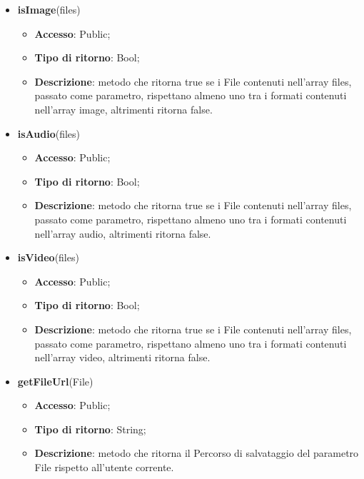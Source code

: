 {{{\begin{itemize}
\begin{itemize}
					\item \textbf{Accesso}: Public;
					\item \textbf{Tipo di ritorno}: Void;
					\item \textbf{Descrizione}: metodo che invia una richiesta XMLHttpRequest a \textit{[hostname]\-/private/api/files//} effettuando l'upload dei File contenuti nell'array files passato come parametro. Se l'operazione ha successo viene richiamato callback, altrimenti viene lanciato un errore.
				\end{itemize}
				\item \textbf{isImage}(files)
				\begin{itemize}
					\item \textbf{Accesso}: Public;
					\item \textbf{Tipo di ritorno}: Bool;
					\item \textbf{Descrizione}: metodo che ritorna true se i File contenuti nell'array files, passato come parametro, rispettano almeno uno tra i formati contenuti nell'array image, altrimenti ritorna false.
				\end{itemize}
				\item \textbf{isAudio}(files)
				\begin{itemize}
					\item \textbf{Accesso}: Public;
					\item \textbf{Tipo di ritorno}: Bool;
					\item \textbf{Descrizione}: metodo che ritorna true se i File contenuti nell'array files, passato come parametro, rispettano almeno uno tra i formati contenuti nell'array audio, altrimenti ritorna false.
				\end{itemize}
				\item \textbf{isVideo}(files)
				\begin{itemize}
					\item \textbf{Accesso}: Public;
					\item \textbf{Tipo di ritorno}: Bool;
					\item \textbf{Descrizione}: metodo che ritorna true se i File contenuti nell'array files, passato come parametro, rispettano almeno uno tra i formati contenuti nell'array video, altrimenti ritorna false.
				\end{itemize}
				\item \textbf{getFileUrl}(File)
				\begin{itemize}
					\item \textbf{Accesso}: Public;
					\item \textbf{Tipo di ritorno}: String;
					\item \textbf{Descrizione}: metodo che ritorna il Percorso di salvataggio del parametro File rispetto all'utente corrente.
				\end{itemize}
			\end{itemize} 
		}
}}
